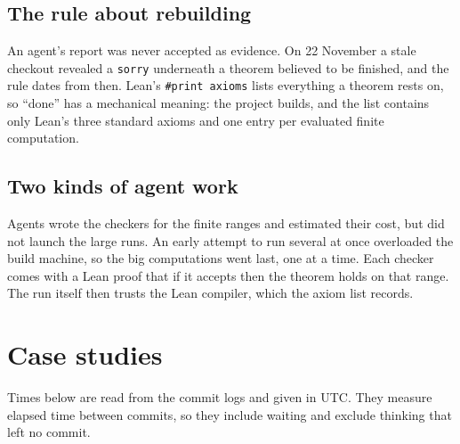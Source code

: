 \documentclass[11pt]{amsart}
\newcommand{\lean}[1]{\texttt{#1}}
\begin{document}
\subsection*{The rule about rebuilding} An agent's report was never accepted as evidence. On 22 November a stale checkout revealed a \lean{sorry} underneath a theorem believed to be finished, and the rule dates from then. Lean's \lean{\#print axioms} lists everything a theorem rests on, so ``done'' has a mechanical meaning: the project builds, and the list contains only Lean's three standard axioms and one entry per evaluated finite computation.

\subsection*{Two kinds of agent work} Agents wrote the checkers for the finite ranges and estimated their cost, but did not launch the large runs. An early attempt to run several at once overloaded the build machine, so the big computations went last, one at a time. Each checker comes with a Lean proof that if it accepts then the theorem holds on that range. The run itself then trusts the Lean compiler, which the axiom list records.

\section{Case studies}\label{sec:cases}

Times below are read from the commit logs and given in UTC. They measure elapsed time between commits, so they include waiting and exclude thinking that left no commit.
\end{document}
